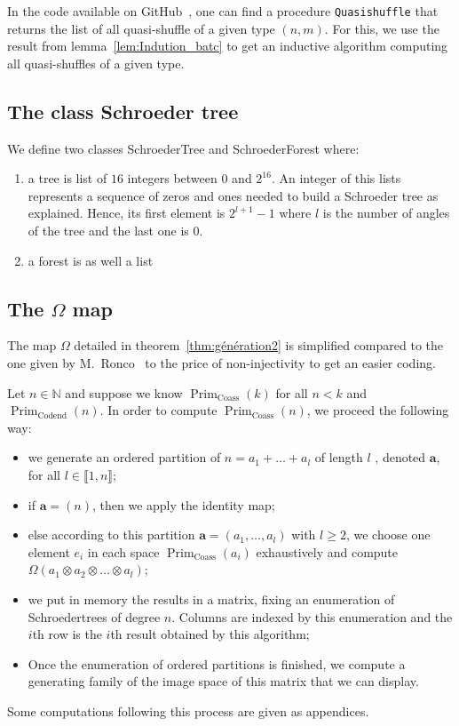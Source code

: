 \documentclass[a4paper,10pt]{amsart}
\DeclareMathOperator{\Prim}{Prim}
\DeclareMathOperator{\Coass}{Coass}
\DeclareMathOperator{\Codend}{Codend}
\newcommand\NN{\mathbb{N}}
\newcommand{\IEM}[2]{\llbracket #1,#2 \rrbracket}
\newcommand{\Schw}{Schroeder} %
\theoremstyle{definition}
\begin{document}
In the code available on GitHub~\cite{Code}, one can find a procedure \lstinline[language=C++]|Quasishuffle| that returns the list of all quasi-shuffle of a given type $(n,m)$. For this, we use the result from lemma~\ref{lem:Indution_batc} to get an inductive algorithm computing all quasi-shuffles of a given type.

\subsection{The class \Schw{} tree}

We define two classes {\ttfamily \Schw{}Tree} and {\ttfamily \Schw{}Forest} where:
\begin{enumerate}
	\item a tree is list of $16$ integers between $0$ and $2^{16}$. An integer of this lists represents a sequence of zeros and ones needed to build a \Schw{} tree as explained. Hence, its first element is $2^{l+1}-1$ where $l$ is the number of angles of the tree and the last one is $0$. 
	\item a forest is as well a list 
\end{enumerate}

\subsection{The $\Omega$ map}

The map $\Omega$ detailed in theorem~\ref{thm:génération2} is simplified compared to the one given by M.~Ronco~\cite{euleridem} to the price of non-injectivity to get an easier coding.

Let $n\in\NN$ and suppose we know $\Prim_{\Coass}(k)$ for all $n<k$ and $\Prim_{\Codend}(n)$. In order to compute $\Prim_{\Coass}(n)$, we proceed the following way:
\begin{itemize}
	\item we generate an ordered partition of $n=a_1+\dots +a_l$ of length $l$ , denoted $\mathbf{a}$, for all $l\in\IEM{1}{n}$;
	\item if $\mathbf{a}=(n)$, then we apply the identity map;
	\item else according to this partition $\mathbf{a}=(a_1,\dots, a_l)$ with $l\geq 2$, we choose one element $e_i$ in each space $\Prim_{\Coass}(a_i)$ exhaustively and compute $\Omega(a_1\otimes a_2 \otimes \ldots \otimes a_l)$;
	\item we put in memory the results in a matrix, fixing an enumeration of \Schw trees of degree $n$. Columns are indexed by this enumeration and the $i$th row is the $i$th result obtained by this algorithm;
	\item Once the enumeration of ordered partitions is finished, we compute a generating family of the image space of this matrix that we can display.
\end{itemize}
Some computations following this process are given as appendices.
\end{document}
